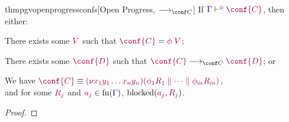 \documentclass[main.tex]{subfiles}
\begin{document}
\begin{restatabletheorem}{thmpgvopenprogressconfs}[Open Progress, $\cred$]
  \label{thm:pgv-open-progress-confs}
  If $\cseq[\phi]{\ty{\Gamma}}{\conf{C}}$, then either:
  \begin{description}[labelwidth=8ex]
  \item[Done]
    There exists some $\tm{V}$ such that $\tm{\conf{C}}=\tm{\phi\;V}$;
  \item[Step]
    There exists some $\tm{\conf{D}}$ such that $\tm{\conf{C}} \cred \tm{\conf{D}}$; or
  \item[Blocked]
    We have $\tm{\conf{C}}\equiv\tm{\res{x_1y_1\dots x_ny_n}{}{(\phi_1R_1 \parallel\dots\parallel \phi_mR_m)}}$,\\
    and for some $\tm{R_j}$ and $\tm{a_j}\in\fn(\ty{\Gamma})$, $\blocked(\tm{a_j},\tm{R_j})$.
  \end{description}
\end{restatabletheorem}
\begin{proof}
  \admit
\end{proof}
\end{document}
